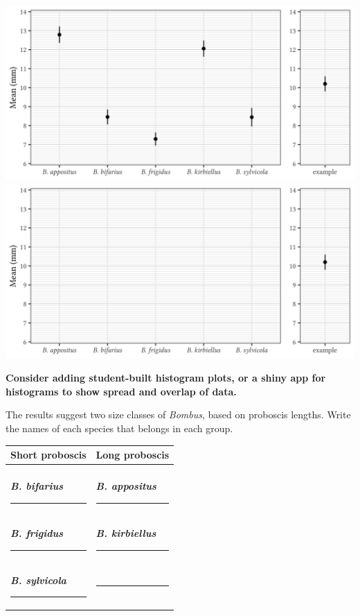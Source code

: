 \documentclass[12pt, hidelinks]{exam}
\begin{document}
\begin{questions}
\ifprintanswers
	\includegraphics[width=\textwidth]{mean_proboscis_plot_key}
\else
	\includegraphics[width=\textwidth]{mean_proboscis_plot_blank}
\fi

\textbf{Consider adding student-built histogram plots, or a shiny 
	app for histograms to show spread and overlap of data.}

\question
The results suggest two size classes of \textit{Bombus}, based on
proboscis lengths.  Write the names of each species that belongs in 
each group.

\begin{tabular}{@{}ll@{}} %
	\toprule
	Short proboscis & Long proboscis \tabularnewline
	\midrule
	& \tabularnewline
	\ifprintanswers \textbf{\textit{B. bifarius}} \else \rule{2in}{0.4pt} \fi &
	\ifprintanswers \textbf{\textit{B. appositus}} \else \rule{2in}{0.4pt} \fi 
	\tabularnewline[2em]
	\ifprintanswers \textbf{\textit{B. frigidus}} \else \rule{2in}{0.4pt} \fi &
	\ifprintanswers \textbf{\textit{B. kirbiellus}} \else \rule{2in}{0.4pt} \fi
	\tabularnewline[2em]
	\ifprintanswers \textbf{\textit{B. sylvicola}} \else \rule{2in}{0.4pt} \fi &
	\rule{1in}{0.4pt} \tabularnewline
	\bottomrule
\end{tabular}


\end{questions}
\end{document}
